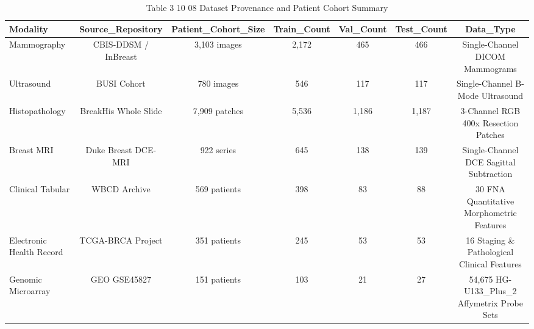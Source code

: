 \begin{table}[htbp]
\centering
\small
\begin{tabular}{lcccccc}
\hline
Modality & Source\_Repository & Patient\_Cohort\_Size & Train\_Count & Val\_Count & Test\_Count & Data\_Type \\
\hline
Mammography & CBIS-DDSM / InBreast & 3,103 images & 2,172 & 465 & 466 & Single-Channel DICOM Mammograms \\
Ultrasound & BUSI Cohort & 780 images & 546 & 117 & 117 & Single-Channel B-Mode Ultrasound \\
Histopathology & BreakHis Whole Slide & 7,909 patches & 5,536 & 1,186 & 1,187 & 3-Channel RGB 400x Resection Patches \\
Breast MRI & Duke Breast DCE-MRI & 922 series & 645 & 138 & 139 & Single-Channel DCE Sagittal Subtraction \\
Clinical Tabular & WBCD Archive & 569 patients & 398 & 83 & 88 & 30 FNA Quantitative Morphometric Features \\
Electronic Health Record & TCGA-BRCA Project & 351 patients & 245 & 53 & 53 & 16 Staging \& Pathological Clinical Features \\
Genomic Microarray & GEO GSE45827 & 151 patients & 103 & 21 & 27 & 54,675 HG-U133\_Plus\_2 Affymetrix Probe Sets \\
\hline
\end{tabular}
\caption{Table 3 10 08 Dataset Provenance and Patient Cohort Summary}
\label{tab:table_3_10_08_dataset_provenance_and_patient_cohort_summary}
\end{table}
